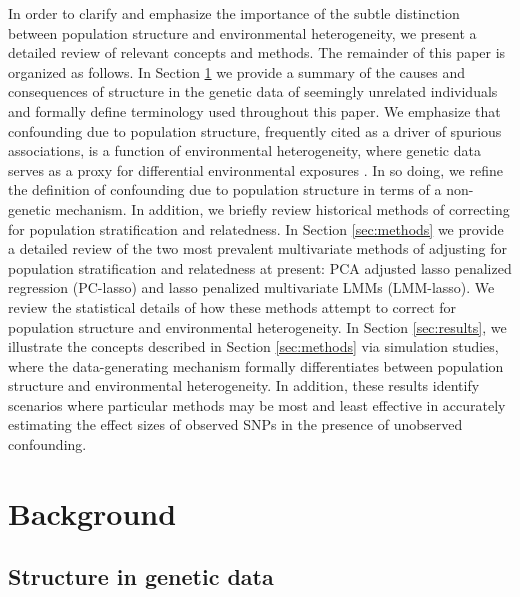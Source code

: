 In order to clarify and emphasize the importance of the subtle distinction between population structure and environmental heterogeneity, we present a detailed review of relevant concepts and methods. The remainder of this paper is organized as follows. In Section \ref{sec:background} we provide a summary of the causes and consequences of structure in the genetic data of seemingly unrelated individuals and formally define terminology used throughout this paper. We emphasize that confounding due to population structure, frequently cited as a driver of spurious associations, is a function of environmental heterogeneity, where genetic data serves as a proxy for differential environmental exposures \citep{Sillanpaeae2011, sul2018population, vilhjalmsson2012nature, barton2019population}. In so doing, we refine the definition of confounding due to population structure in terms of a non-genetic mechanism. In addition, we briefly review historical methods of correcting for population stratification and relatedness. In Section \ref{sec:methods} we provide a detailed review of the two most prevalent multivariate methods of adjusting for population stratification and relatedness at present: PCA adjusted lasso penalized regression (PC-lasso) and lasso penalized multivariate LMMs (LMM-lasso). We review the statistical details of how these methods attempt to correct for population structure and environmental heterogeneity. In Section \ref{sec:results}, we illustrate the concepts described in Section \ref{sec:methods} via simulation studies, where the data-generating mechanism formally differentiates between population structure and environmental heterogeneity. In addition, these results identify scenarios where particular methods may be most and least effective in accurately estimating the effect sizes of observed SNPs in the presence of unobserved confounding.




\section{Background} \label{sec:background}

\subsection{Structure in genetic data}


